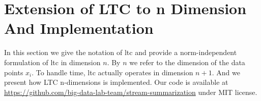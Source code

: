\chapter{Extension of LTC to n Dimension And Implementation}
\label{chap:ltc-extension}

In this section we give the notation of \acrshort{ltc} and provide a norm-independent
formulation of \acrshort{ltc} in dimension $n$. By $n$ we refer to the dimension of the
data points $x_i$. To handle time, \acrshort{ltc} actually operates in dimension $n+1$. And
we present how LTC n-dimensions is implemented. Our code is available at
\url{https://github.com/big-data-lab-team/stream-summarization} under MIT
license.





